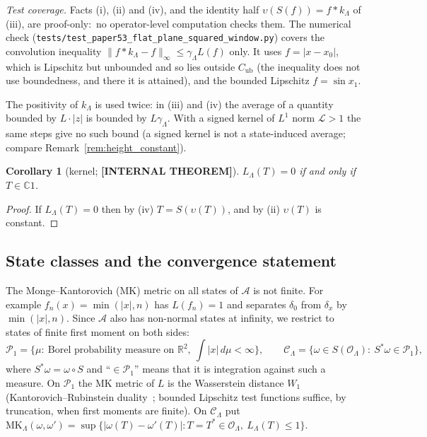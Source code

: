 \documentclass[11pt,a4paper]{article}
\theoremstyle{plain}
\newtheorem{corollary}[theorem]{Corollary}
\theoremstyle{definition}
\newcommand{\Op}{\mathcal{O}}
\newcommand{\Acal}{\mathcal{A}}
\newcommand{\supnorm}[1]{\lVert #1 \rVert_{\infty}}
\newcommand{\R}{\mathbb{R}}
\newcommand{\C}{\mathbb{C}}
\newcommand{\MK}{\mathrm{MK}}
\newcommand{\Prob}{\mathcal{P}_{1}}
\newcommand{\Cst}{\mathcal{C}}
\newcommand{\Lebesgue}{\mathcal{L}}
\begin{document}
\emph{Test coverage.} Facts (i), (ii) and (iv), and the identity half
$\upsilon(S(f))=f*k_{\Lambda}$ of (iii), are proof-only:\ no operator-level
computation checks them. The numerical check
(\texttt{tests/test\_paper53\_flat\_plane\_squared\_window.py}) covers the
convolution inequality $\supnorm{f*k_{\Lambda}-f}\le\gamma_{\Lambda}L(f)$
only. It uses $f=|x-x_{0}|$, which is Lipschitz but unbounded and so lies
outside $C_{\mathrm{ub}}$ (the inequality does not use boundedness, and
there it is attained), and the bounded Lipschitz $f=\sin x_{1}$.

The positivity of $k_{\Lambda}$ is used twice: in (iii) and (iv) the
average of a quantity bounded by $L\cdot|z|$ is bounded by $L\gamma_{\Lambda}$.
With a signed kernel of $L^{1}$ norm $\Lebesgue>1$ the same steps give no
such bound (a signed kernel is not a state-induced average; compare
Remark~\ref{rem:height_constant}).

\begin{corollary}[kernel; \textbf{[INTERNAL THEOREM]}]\label{cor:kernel}
$L_{\Lambda}(T)=0$ if and only if $T\in\C1$.
\end{corollary}
\begin{proof}
If $L_{\Lambda}(T)=0$ then by (iv) $T=S(\upsilon(T))$, and by (ii)
$\upsilon(T)$ is constant.
\end{proof}

\subsection{State classes and the convergence statement}
The Monge--Kantorovich (MK) metric on all states of $\Acal$ is not
finite. For example $f_{n}(x)=\min(|x|,n)$ has $L(f_{n})=1$ and separates
$\delta_{0}$ from $\delta_{x}$ by $\min(|x|,n)$. Since $\Acal$ also has
non-normal states at infinity, we restrict to states of finite first
moment on both sides:
\[
\Prob=\{\mu:\ \text{Borel probability measure on }\R^{2},\
\textstyle\int|x|\,d\mu<\infty\},\qquad
\Cst_{\Lambda}=\{\omega\in S(\Op_{\Lambda}):\ S^{*}\omega\in\Prob\},
\]
where $S^{*}\omega=\omega\circ S$ and ``$\in\Prob$'' means that it is
integration against such a measure. On $\Prob$ the MK metric of $L$ is
the Wasserstein distance $W_{1}$ (Kantorovich--Rubinstein
duality~\cite{villani2009}; bounded Lipschitz test functions suffice,
by truncation, when first moments are finite). On $\Cst_{\Lambda}$ put
$\MK_{\Lambda}(\omega,\omega')=\sup\{|\omega(T)-\omega'(T)|:T=T^{*}\in
\Op_{\Lambda},\ L_{\Lambda}(T)\le1\}$.
\end{document}
